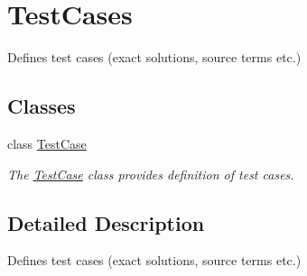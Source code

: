 \hypertarget{group__TestCases}{}\section{Test\+Cases}
\label{group__TestCases}


Defines test cases (exact solutions, source terms etc.)  


\subsection*{Classes}
\begin{DoxyCompactItemize}
\item 
class \hyperlink{classTestCase}{Test\+Case}
\begin{DoxyCompactList}\small\item\em The \hyperlink{classTestCase}{Test\+Case} class provides definition of test cases. \end{DoxyCompactList}\end{DoxyCompactItemize}


\subsection{Detailed Description}
Defines test cases (exact solutions, source terms etc.) 

